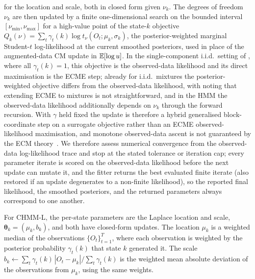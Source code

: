 for the location and scale, both in closed form given $\nu_k$. The degrees of freedom $\nu_k$ are then updated by a finite one-dimensional search on the bounded interval $[\nu_{\min}, \nu_{\max}]$ for a high-value point of the state-$k$ objective $Q_k(\nu) = \sum_t \gamma_t(k) \log t_\nu(O_t; \mu_k, \sigma_k)$, the posterior-weighted marginal Student-$t$ log-likelihood at the current smoothed posteriors, used in place of the augmented-data CM update in $\mathbb{E}[\log u]$. In the single-component i.i.d.\ setting of \citet{liu1995ml}, where all $\gamma_t(k) = 1$, this objective is the observed-data likelihood and its direct maximisation is the ECME step; already for i.i.d.\ mixtures the posterior-weighted objective differs from the observed-data likelihood, with \citet{peel2000robust} noting that extending ECME to mixtures is not straightforward, and in the HMM the observed-data likelihood additionally depends on $\nu_k$ through the forward recursion. With $\gamma$ held fixed the update is therefore a hybrid generalised block-coordinate step on a surrogate objective rather than an ECME observed-likelihood maximisation, and monotone observed-data ascent is not guaranteed by the ECM theory~\cite{wu1983convergence, mengrubin1993ecm}. We therefore assess numerical convergence from the observed-data log-likelihood trace and stop at the stated tolerance or iteration cap; every parameter iterate is scored on the observed-data likelihood before the next update can mutate it, and the fitter returns the best evaluated finite iterate (also restored if an update degenerates to a non-finite likelihood), so the reported final likelihood, the smoothed posteriors, and the returned parameters always correspond to one another.

For CHMM-L, the per-state parameters are the Laplace location and scale, $\boldsymbol\theta_k = (\mu_k, b_k)$, and both have closed-form updates. The location $\mu_k$ is a weighted median of the observations $\{O_t\}_{t=1}^T$, where each observation is weighted by the posterior probability $\gamma_t(k)$ that state $k$ generated it. The scale $b_k \leftarrow \sum_t \gamma_t(k)\, |O_t - \mu_k| / \sum_t \gamma_t(k)$ is the weighted mean absolute deviation of the observations from $\mu_k$, using the same weights.

